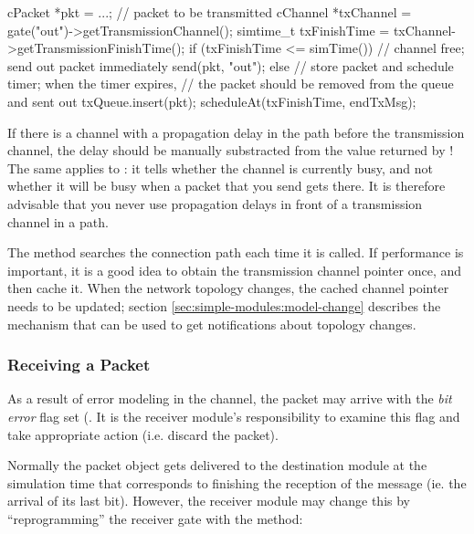 \begin{cpp}
cPacket *pkt = ...; // packet to be transmitted
cChannel *txChannel = gate("out")->getTransmissionChannel();
simtime_t txFinishTime = txChannel->getTransmissionFinishTime();
if (txFinishTime <= simTime()) {
    // channel free; send out packet immediately
    send(pkt, "out");
}
else {
    // store packet and schedule timer; when the timer expires,
    // the packet should be removed from the queue and sent out
    txQueue.insert(pkt);
    scheduleAt(txFinishTime, endTxMsg);
}
\end{cpp}

\begin{note}
  If there is a channel with a propagation delay in
  the path before the transmission channel, the delay should be manually
  substracted from the value returned by !
  The same applies to : it tells whether the channel is
  currently busy, and not whether it will be busy when a packet that you send
  gets there. It is therefore advisable that you never use propagation delays
  in front of a transmission channel in a path.
\end{note}

The  method searches the connection path each
time it is called. If performance is important, it is a good idea to obtain
the transmission channel pointer once, and then cache it. When the network topology
changes, the cached channel pointer needs to be updated; section
\ref{sec:simple-modules:model-change} describes the mechanism that can
be used to get notifications about topology changes.

\subsubsection{Receiving a Packet}
\label{sec:simple-modules:receiving-a-packet}

As a result of error modeling in the channel, the packet may arrive
with the \textit{bit error} flag set (.
It is the receiver module's responsibility to examine this flag
and take appropriate action (i.e. discard the packet).

Normally the packet object gets delivered to the destination module
at the simulation time that corresponds to finishing the reception
of the message (ie. the arrival of its last bit). However, the receiver
module may change this by ``reprogramming'' the receiver gate with
the  method:

